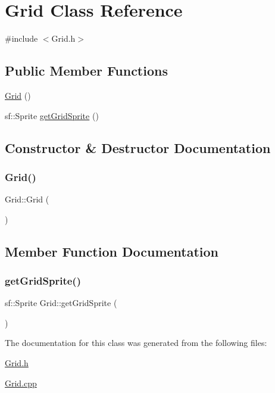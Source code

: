 \hypertarget{class_grid}{}\section{Grid Class Reference}
\label{class_grid}


{\ttfamily \#include $<$Grid.\+h$>$}

\subsection*{Public Member Functions}
\begin{DoxyCompactItemize}
\item 
\mbox{\hyperlink{class_grid_a4ac9ff4f63552b4c61ff90fcb35ad66c}{Grid}} ()
\item 
sf\+::\+Sprite \mbox{\hyperlink{class_grid_a814aacaa7902d4d9ff69470abb4a353e}{get\+Grid\+Sprite}} ()
\end{DoxyCompactItemize}


\subsection{Constructor \& Destructor Documentation}
\mbox{\label{class_grid_a4ac9ff4f63552b4c61ff90fcb35ad66c}} 
\subsubsection{\texorpdfstring{Grid()}{Grid()}}
{\footnotesize\ttfamily Grid\+::\+Grid (\begin{DoxyParamCaption}{ }\end{DoxyParamCaption})}



\subsection{Member Function Documentation}
\mbox{\label{class_grid_a814aacaa7902d4d9ff69470abb4a353e}} 
\subsubsection{\texorpdfstring{get\+Grid\+Sprite()}{getGridSprite()}}
{\footnotesize\ttfamily sf\+::\+Sprite Grid\+::get\+Grid\+Sprite (\begin{DoxyParamCaption}{ }\end{DoxyParamCaption})}



The documentation for this class was generated from the following files\+:\begin{DoxyCompactItemize}
\item 
\mbox{\hyperlink{_grid_8h}{Grid.\+h}}\item 
\mbox{\hyperlink{_grid_8cpp}{Grid.\+cpp}}\end{DoxyCompactItemize}
